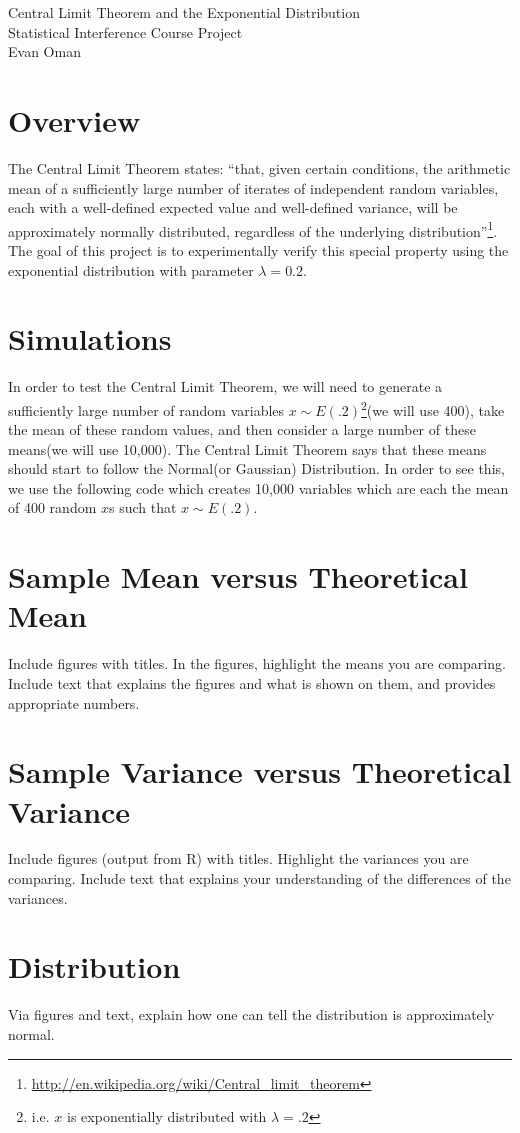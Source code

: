 \documentclass[11pt]{article}
\begin{document}
\begin{center}
{\LARGE Central Limit Theorem and the Exponential Distribution \\Statistical Interference Course Project
}\\
Evan Oman
\end{center}

\section{Overview}
The Central Limit Theorem states: ``that, given certain conditions, the arithmetic mean of a sufficiently large number of iterates of independent random variables, each with a well-defined expected value and well-defined variance, will be approximately normally distributed, regardless of the underlying distribution''\footnote{\url{http://en.wikipedia.org/wiki/Central\_limit\_theorem}}. The goal of this project is to experimentally verify this special property using the exponential distribution with parameter $\lambda = 0.2$.

\section{Simulations}
In order to test the Central Limit Theorem, we will need to generate a sufficiently large number of random variables $x \sim E(.2)$\footnote{i.e. $x$ is exponentially distributed with $\lambda = .2$}(we will use 400), take the mean of these random values, and then consider a large number of these means(we will use 10,000). The Central Limit Theorem says that these means should start to follow the Normal(or Gaussian) Distribution. In order to see this, we use the following code which creates 10,000 variables which are each the mean of 400 random $x$s such that $x \sim E(.2)$.

\section{Sample Mean versus Theoretical Mean}
Include figures with titles. In the figures, highlight the means you are comparing. Include text that explains the figures and what is shown on them, and provides appropriate numbers.

\section{Sample Variance versus Theoretical Variance} Include figures (output from R) with titles. Highlight the variances you are comparing. Include text that explains your understanding of the differences of the variances.

\section{Distribution} Via figures and text, explain how one can tell the distribution is approximately normal.
\end{document}
